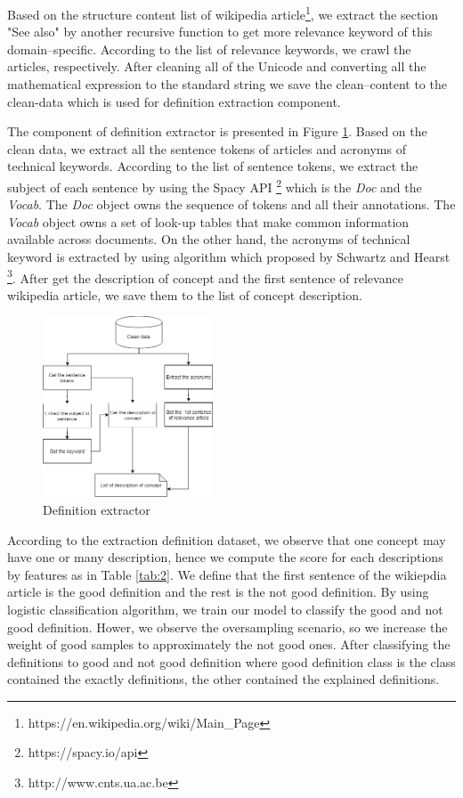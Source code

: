 \documentclass[letterpaper%
, twoside%
, 12pt%
,these%
, english%
,creativecommons,hyperref, withAlgo2e %
]{thETS}
\begin{document}
Based on the structure content list of wikipedia article\footnote{https://en.wikipedia.org/wiki/Main\_Page}, we extract the section "See also" by another recursive function to get more relevance keyword of this domain--specific. According to the list of relevance keywords, we crawl the articles, respectively. After cleaning all of the Unicode and converting all the mathematical expression to the standard string we save the clean--content to the clean-data which is used for definition extraction component. 

The component of definition extractor is presented in Figure \ref{defex}. Based on the clean data, we extract all the sentence tokens of articles and acronyms of technical keywords. According to the list of sentence tokens, we extract the subject of each sentence by using the Spacy API \footnote{https://spacy.io/api} which is the \textit{Doc} and the \textit{Vocab}. The \textit{Doc} object owns the sequence of tokens and all their annotations. The \textit{Vocab} object owns a set of look-up tables that make common information available across documents. On the other hand, the acronyms of technical keyword is extracted by using algorithm which proposed by Schwartz and Hearst \footnote{http://www.cnts.ua.ac.be}. After get the description of concept and the first sentence of relevance wikipedia article, we save them to the list of concept description.


\begin{figure}
\includegraphics[width=0.45\textwidth]{Figures/df1.png}
\caption{Definition extractor}
\label{defex}
\end{figure} 

 
According to the extraction definition dataset, we observe that one concept may have one or many description, hence we compute the score for each descriptions by features as in Table \ref{tab:2}. We define that the first sentence of the wikiepdia article is the good definition and the rest is the not good definition. By using logistic classification algorithm, we train our model to classify the good and not good definition. Hower, we observe the oversampling scenario, so we increase the weight of good samples to approximately the not good ones. After classifying the definitions to good and not good definition  where good definition class is the class contained the exactly definitions, the other contained the explained definitions. 
\end{document}
